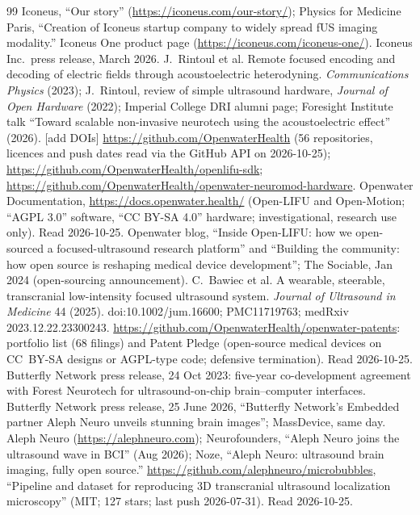 \documentclass[11pt,a4paper]{article}
\newcommand{\todo}[1]{\textcolor{red!70!black}{[#1]}}
\begin{document}
\begin{thebibliography}{99}
 Iconeus, ``Our story'' (\url{https://iconeus.com/our-story/}); Physics for Medicine Paris, ``Creation of Iconeus startup company to widely spread fUS imaging modality.''
 Iconeus One product page (\url{https://iconeus.com/iconeus-one/}).
 Iconeus Inc.\ press release, March 2026.
 J.~Rintoul et al. Remote focused encoding and decoding of electric fields through acoustoelectric heterodyning. \emph{Communications Physics} (2023); J.~Rintoul, review of simple ultrasound hardware, \emph{Journal of Open Hardware} (2022); Imperial College DRI alumni page; Foresight Institute talk ``Toward scalable non-invasive neurotech using the acoustoelectric effect'' (2026). \todo{add DOIs}
 \url{https://github.com/OpenwaterHealth} (56 repositories, licences and push dates read via the GitHub API on 2026-10-25); \url{https://github.com/OpenwaterHealth/openlifu-sdk}; \url{https://github.com/OpenwaterHealth/openwater-neuromod-hardware}.
 Openwater Documentation, \url{https://docs.openwater.health/} (Open-LIFU and Open-Motion; ``AGPL 3.0'' software, ``CC BY-SA 4.0'' hardware; investigational, research use only). Read 2026-10-25.
 Openwater blog, ``Inside Open-LIFU: how we open-sourced a focused-ultrasound research platform'' and ``Building the community: how open source is reshaping medical device development''; The Sociable, Jan 2024 (open-sourcing announcement).
 C.~Bawiec et al. A wearable, steerable, transcranial low-intensity focused ultrasound system. \emph{Journal of Ultrasound in Medicine} 44 (2025). doi:10.1002/jum.16600; PMC11719763; medRxiv 2023.12.22.23300243.
 \url{https://github.com/OpenwaterHealth/openwater-patents}: portfolio list (68 filings) and Patent Pledge (open-source medical devices on CC~BY-SA designs or AGPL-type code; defensive termination). Read 2026-10-25.
 Butterfly Network press release, 24 Oct 2023: five-year co-development agreement with Forest Neurotech for ultrasound-on-chip brain--computer interfaces.
 Butterfly Network press release, 25 June 2026, ``Butterfly Network's Embedded partner Aleph Neuro unveils stunning brain images''; MassDevice, same day.
 Aleph Neuro (\url{https://alephneuro.com}); Neurofounders, ``Aleph Neuro joins the ultrasound wave in BCI'' (Aug 2026); Noze, ``Aleph Neuro: ultrasound brain imaging, fully open source.''
 \url{https://github.com/alephneuro/microbubbles}, ``Pipeline and dataset for reproducing 3D transcranial ultrasound localization microscopy'' (MIT; 127 stars; last push 2026-07-31). Read 2026-10-25.

\end{thebibliography}
\end{document}
